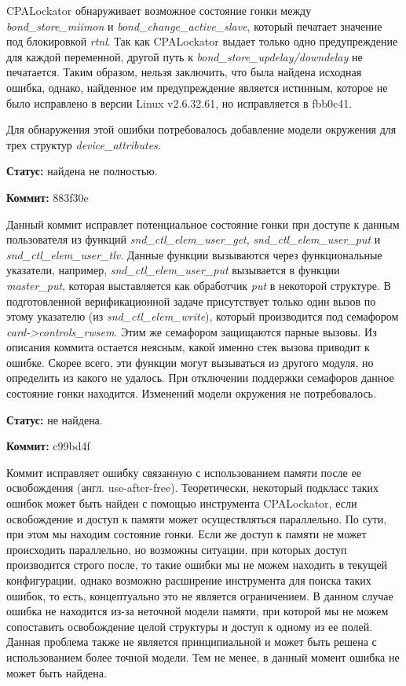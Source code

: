 CPALockator обнаруживает возможное состояние гонки между \textit{bond\_store\_miimon} и \textit{bond\_change\_active\_slave}, который печатает значение под блокировкой \textit{rtnl}.
Так как CPALockator выдает только одно предупреждение для каждой переменной, другой путь к \textit{bond\_store\_updelay/downdelay} не печатается.
Таким образом, нельзя заключить, что была найдена исходная ошибка, однако, найденное им предупреждение является истинным, которое не было исправлено в версии Linux v2.6.32.61, но исправляется в fbb0c41.

Для обнаружения этой ошибки потребовалось добавление модели окружения для трех структур \textit{device\_attributes}.

\textbf{Статус:} найдена не полностью.

\vspace{1cm}

\textbf{Коммит:} 883f30e

Данный коммит исправлет потенциальное состояние гонки при доступе к данным пользователя из функций \textit{snd\_ctl\_elem\_user\_get}, \textit{snd\_ctl\_elem\_user\_put} и \textit{snd\_ctl\_elem\_user\_tlv}.
Данные функции вызываются через функциональные указатели, например, \textit{snd\_ctl\_elem\_user\_put} вызывается в функции \textit{master\_put}, которая выставляется как обработчик \textit{put} в некоторой структуре. 
В подготовленной верификационной задаче присутствует только один вызов по этому указателю (из \textit{snd\_ctl\_elem\_write}), который производится под семафором \textit{card->controls\_rwsem}.
Этим же семафором защищаются парные вызовы.
Из описания коммита остается неясным, какой именно стек вызова приводит к ошибке.
Скорее всего, эти функции могут вызываться из другого модуля, но определить из какого не удалось.
При отключении поддержки семафоров данное состояние гонки находится.
Изменений модели окружения не потребовалось.

\textbf{Статус:} не найдена.

\vspace{1cm}

\textbf{Коммит:} c99bd4f

Коммит исправляет ошибку связанную с использованием памяти после ее освобождения (англ. use-after-free).
Теоретически, некоторый подкласс таких ошибок может быть найден с помощью инструмента CPALockator, если освобождение и доступ к памяти может осуществляться параллельно.
По сути, при этом мы находим состояние гонки. 
Если же доступ к памяти не может происходить параллельно, но возможны ситуации, при которых доступ производится строго после, то такие ошибки мы не можем находить в текущей конфигурации, однако возможно расширение инструмента для поиска таких ошибок, то есть, концептуально это не является ограничением.
В данном случае ошибка не находится из-за неточной модели памяти, при которой мы не можем сопоставить освобождение целой структуры и доступ к одному из ее полей.
Данная проблема также не является принципиальной и может быть решена с использованием более точной модели.
Тем не менее, в данный момент ошибка не может быть найдена.

